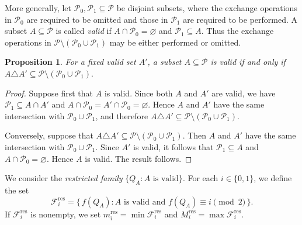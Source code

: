 \documentclass[10pt,a4paper]{amsart}
\newtheorem{proposition}[theorem]{Proposition}
\begin{document}
More generally, let $\mathcal P_0,\mathcal P_1\subseteq\mathcal P$ be disjoint subsets, where the exchange operations in $\mathcal P_0$ are required to be omitted and those in $\mathcal P_1$ are required to be performed. A subset $A\subseteq\mathcal P$ is called \emph{valid} if $A\cap\mathcal P_0=\varnothing$ and $\mathcal P_1\subseteq A$. Thus the exchange operations in $\mathcal P\setminus(\mathcal P_0\cup\mathcal P_1)$ may be either performed or omitted.

\begin{proposition}\label{prop4:1}
 For a fixed valid set $A'$, a subset $A\subseteq\mathcal P$ is valid
if and only if $
A\triangle A'
\subseteq
\mathcal P\setminus(\mathcal P_0\cup\mathcal P_1).
$
\end{proposition}
\begin{proof}
Suppose first that $A$ is valid. Since both $A$ and $A'$ are valid,
we have $\mathcal P_1\subseteq A\cap A'$ and
$A\cap\mathcal P_0=A'\cap\mathcal P_0=\varnothing$. Hence $A$ and
$A'$   have the same intersection with
$\mathcal P_0\cup\mathcal P_1$, and therefore
$A\triangle A'\subseteq
\mathcal P\setminus(\mathcal P_0\cup\mathcal P_1)$.

Conversely, suppose that
$A\triangle A'\subseteq
\mathcal P\setminus(\mathcal P_0\cup\mathcal P_1)$.
Then $A$ and $A'$  have the same intersection with
$\mathcal P_0\cup\mathcal P_1$. Since $A'$ is valid, it follows that
$\mathcal P_1\subseteq A$ and
$A\cap\mathcal P_0=\varnothing$. Hence $A$ is valid. The result follows.
\end{proof}


We consider the \textit{restricted family}
$\{Q_A:  A \text{ is valid}\}$.
For each $i\in\{0,1\}$, we define the set
\[
\mathcal F_i^{\mathrm{res}} = \big\{\,f(Q_A) : A \text{ is valid and } f(Q_A)\equiv i\pmod{2}\,\big\}.
\]
If $\mathcal F_i^{\mathrm{res}}$ is nonempty, we set $m_i^{\mathrm{res}} = \min\mathcal F_i^{\mathrm{res}}$ and $M_i^{\mathrm{res}} = \max\mathcal F_i^{\mathrm{res}}$.
\end{document}
